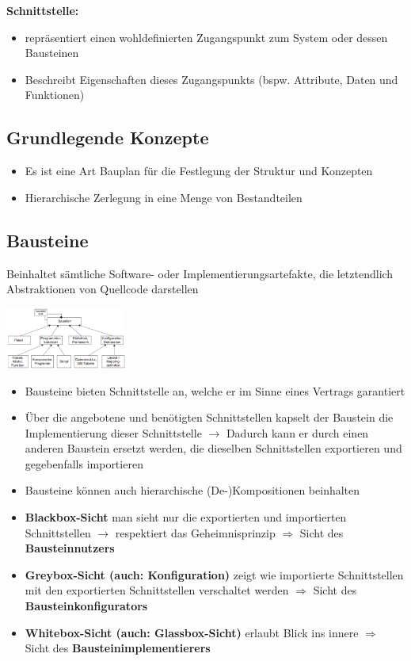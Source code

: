 \documentclass{report}
\newenvironment{Figure}
	{\par\medskip\noindent\minipage{\linewidth}}
	{\endminipage\par\medskip}
\theoremstyle{definition}
\theoremstyle{example}
\begin{document}
\textbf{Schnittstelle:}
\begin{itemize}
   \item repräsentiert einen wohldefinierten Zugangspunkt zum System oder dessen Bausteinen
   \item Beschreibt Eigenschaften dieses Zugangspunkts (bspw. Attribute, Daten und Funktionen)
\end{itemize}

\subsection{Grundlegende Konzepte}
\begin{itemize}
   \item Es ist eine Art Bauplan für die Festlegung der Struktur und Konzepten
   \item Hierarchische Zerlegung in eine Menge von Bestandteilen
\end{itemize}

\subsection{Bausteine}
Beinhaltet sämtliche Software- oder Implementierungsartefakte, die letztendlich Abstraktionen von Quellcode darstellen
\begin{Figure}
   \centering
    \includegraphics[width=150px]{img/Bausteine.png}
        \label{fig:Abbildung Bausteine}
\end{Figure}

\begin{itemize}
   \item Bausteine bieten Schnittstelle an, welche er im Sinne eines Vertrags garantiert
   \item Über die angebotene und benötigten Schnittstellen kapselt der Baustein die Implementierung dieser Schnittstelle
   \subitem $\rightarrow$ Dadurch kann er durch einen anderen Baustein ersetzt werden, die dieselben Schnittstellen exportieren und gegebenfalls importieren
   \item Bausteine können auch hierarchische (De-)Kompositionen beinhalten
   \item \textbf{Blackbox-Sicht} man sieht nur die exportierten und importierten Schnittstellen $\rightarrow$ respektiert das Geheimnisprinzip
   \subitem $\Rightarrow$ Sicht des \textbf{Bausteinnutzers} 
   \item \textbf{Greybox-Sicht (auch: Konfiguration)} zeigt wie importierte Schnittstellen mit den exportierten Schnittstellen verschaltet werden
   \subitem $\Rightarrow$ Sicht des \textbf{Bausteinkonfigurators} 
   \item \textbf{Whitebox-Sicht (auch: Glassbox-Sicht)} erlaubt Blick ins innere
   \subitem $\Rightarrow$ Sicht des \textbf{Bausteinimplementierers}  
\end{itemize}
\end{document}
